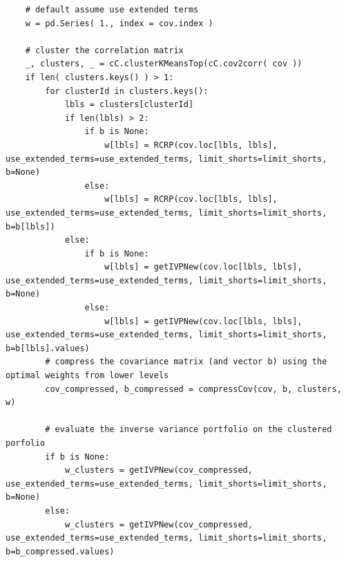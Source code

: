 \documentclass[10pt,twoside,titlepage]{article}   %
\begin{document}
\begin{lstlisting}
    # default assume use extended terms
    w = pd.Series( 1., index = cov.index )

    # cluster the correlation matrix
    _, clusters, _ = cC.clusterKMeansTop(cC.cov2corr( cov ))
    if len( clusters.keys() ) > 1:
        for clusterId in clusters.keys():
            lbls = clusters[clusterId]
            if len(lbls) > 2:
                if b is None:
                    w[lbls] = RCRP(cov.loc[lbls, lbls], use_extended_terms=use_extended_terms, limit_shorts=limit_shorts, b=None)
                else:
                    w[lbls] = RCRP(cov.loc[lbls, lbls], use_extended_terms=use_extended_terms, limit_shorts=limit_shorts, b=b[lbls])
            else:
                if b is None:
                    w[lbls] = getIVPNew(cov.loc[lbls, lbls], use_extended_terms=use_extended_terms, limit_shorts=limit_shorts, b=None)
                else:
                    w[lbls] = getIVPNew(cov.loc[lbls, lbls], use_extended_terms=use_extended_terms, limit_shorts=limit_shorts, b=b[lbls].values)
        # compress the covariance matrix (and vector b) using the optimal weights from lower levels
        cov_compressed, b_compressed = compressCov(cov, b, clusters, w)

        # evaluate the inverse variance portfolio on the clustered porfolio
        if b is None:
            w_clusters = getIVPNew(cov_compressed, use_extended_terms=use_extended_terms, limit_shorts=limit_shorts, b=None)
        else:
            w_clusters = getIVPNew(cov_compressed, use_extended_terms=use_extended_terms, limit_shorts=limit_shorts, b=b_compressed.values)


\end{lstlisting}
\end{document}
